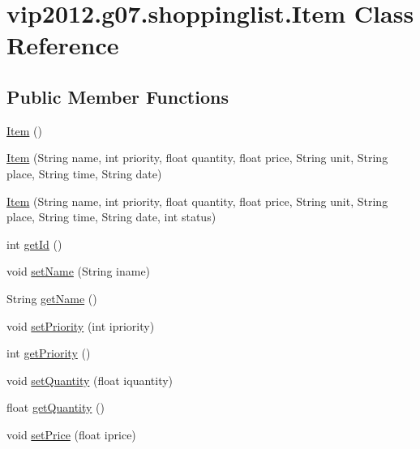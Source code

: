 \hypertarget{classvip2012_1_1g07_1_1shoppinglist_1_1Item}{\section{vip2012.\-g07.\-shoppinglist.\-Item Class Reference}
\label{classvip2012_1_1g07_1_1shoppinglist_1_1Item}
}
\subsection*{Public Member Functions}
\begin{DoxyCompactItemize}
\item 
\hyperlink{classvip2012_1_1g07_1_1shoppinglist_1_1Item_a331ca4db4762134e5c6d542c893ba17b}{Item} ()
\item 
\hyperlink{classvip2012_1_1g07_1_1shoppinglist_1_1Item_a29ab6c8b6d97c0b40e7ec19df1f49bf9}{Item} (String name, int priority, float quantity, float price, String unit, String place, String time, String date)
\item 
\hyperlink{classvip2012_1_1g07_1_1shoppinglist_1_1Item_ad23d924fd73b1f5a34cb1e7f0d1c12b2}{Item} (String name, int priority, float quantity, float price, String unit, String place, String time, String date, int status)
\item 
int \hyperlink{classvip2012_1_1g07_1_1shoppinglist_1_1Item_ad9414ee145d458f315961c1f2e2faf60}{get\-Id} ()
\item 
void \hyperlink{classvip2012_1_1g07_1_1shoppinglist_1_1Item_aa9872e25ee885972342abda59bb3f616}{set\-Name} (String iname)
\item 
String \hyperlink{classvip2012_1_1g07_1_1shoppinglist_1_1Item_a88788d3b8f741aa86f961b71416a55be}{get\-Name} ()
\item 
void \hyperlink{classvip2012_1_1g07_1_1shoppinglist_1_1Item_a447e1639777c78e1a03e3e76553c94d5}{set\-Priority} (int ipriority)
\item 
int \hyperlink{classvip2012_1_1g07_1_1shoppinglist_1_1Item_a5b30fc72fb323a26f8982203546919f0}{get\-Priority} ()
\item 
void \hyperlink{classvip2012_1_1g07_1_1shoppinglist_1_1Item_aa3608aed9d930e5044b9f7cf6ac88830}{set\-Quantity} (float iquantity)
\item 
float \hyperlink{classvip2012_1_1g07_1_1shoppinglist_1_1Item_a18b61c503de2ea99dd5fb92cfcebfa65}{get\-Quantity} ()
\item 
void \hyperlink{classvip2012_1_1g07_1_1shoppinglist_1_1Item_af390549fc22ae4b5921db2b6756a80d6}{set\-Price} (float iprice)

\end{DoxyCompactItemize}
